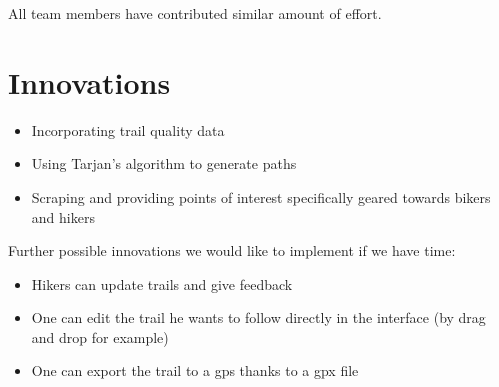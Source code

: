 \documentclass[sigconf]{acmart}
\begin{document}
All team members have contributed similar amount of effort.

\section{Innovations}
\begin{itemize}
	\item Incorporating trail quality data
	\item Using Tarjan's algorithm to generate paths
	\item Scraping and providing points of interest specifically geared towards bikers and hikers
\end{itemize}

Further possible innovations we would like to implement if we have time:
\begin{itemize}
	\item Hikers can update trails and give feedback
	\item One can edit the trail he wants to follow directly in the interface (by drag and drop for example)
	\item One can export the trail to a gps thanks to a gpx file
\end{itemize}
\end{document}
